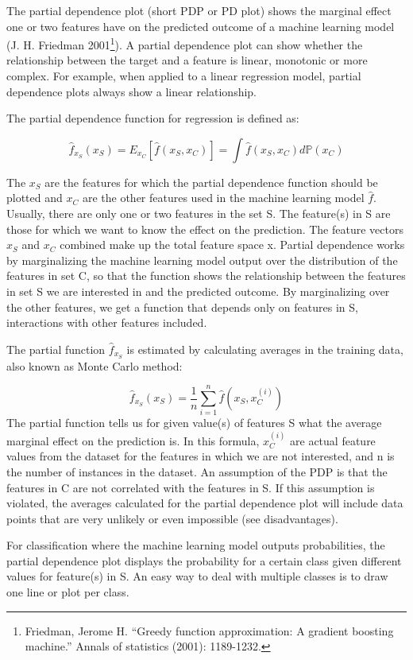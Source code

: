 \documentclass[
  12pt,
]{krantz}
\begin{document}
The partial dependence plot (short PDP or PD plot) shows the marginal effect one or two features have on the predicted outcome of a machine learning model (J. H. Friedman 2001\footnote{Friedman, Jerome H. ``Greedy function approximation: A gradient boosting machine.'' Annals of statistics (2001): 1189-1232.}).
A partial dependence plot can show whether the relationship between the target and a feature is linear, monotonic or more complex.
For example, when applied to a linear regression model, partial dependence plots always show a linear relationship.

The partial dependence function for regression is defined as:

\[\hat{f}_{x_S}(x_S)=E_{x_C}\left[\hat{f}(x_S,x_C)\right]=\int\hat{f}(x_S,x_C)d\mathbb{P}(x_C)\]

The \(x_S\) are the features for which the partial dependence function should be plotted and \(x_C\) are the other features used in the machine learning model \(\hat{f}\).
Usually, there are only one or two features in the set S.
The feature(s) in S are those for which we want to know the effect on the prediction.
The feature vectors \(x_S\) and \(x_C\) combined make up the total feature space x.
Partial dependence works by marginalizing the machine learning model output over the distribution of the features in set C, so that the function shows the relationship between the features in set S we are interested in and the predicted outcome.
By marginalizing over the other features, we get a function that depends only on features in S, interactions with other features included.

The partial function \(\hat{f}_{x_S}\) is estimated by calculating averages in the training data, also known as Monte Carlo method:

\[\hat{f}_{x_S}(x_S)=\frac{1}{n}\sum_{i=1}^n\hat{f}(x_S,x^{(i)}_{C})\]
The partial function tells us for given value(s) of features S what the average marginal effect on the prediction is.
In this formula, \(x^{(i)}_{C}\) are actual feature values from the dataset for the features in which we are not interested, and n is the number of instances in the dataset.
An assumption of the PDP is that the features in C are not correlated with the features in S.
If this assumption is violated, the averages calculated for the partial dependence plot will include data points that are very unlikely or even impossible (see disadvantages).

For classification where the machine learning model outputs probabilities, the partial dependence plot displays the probability for a certain class given different values for feature(s) in S.
An easy way to deal with multiple classes is to draw one line or plot per class.
\end{document}
